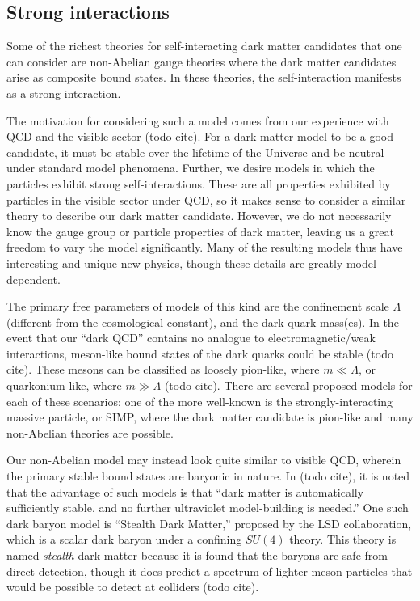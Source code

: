 \hypertarget{strong-interactions}{%
\subsection{Strong interactions}\label{strong-interactions}}

Some of the richest theories for self-interacting dark matter candidates
that one can consider are non-Abelian gauge theories where the dark
matter candidates arise as composite bound states. In these theories,
the self-interaction manifests as a strong interaction.

The motivation for considering such a model comes from our experience
with QCD and the visible sector (todo cite). For a dark matter model to
be a good candidate, it must be stable over the lifetime of the Universe
and be neutral under standard model phenomena. Further, we desire models
in which the particles exhibit strong self-interactions. These are all
properties exhibited by particles in the visible sector under QCD, so it
makes sense to consider a similar theory to describe our dark matter
candidate. However, we do not necessarily know the gauge group or
particle properties of dark matter, leaving us a great freedom to vary
the model significantly. Many of the resulting models thus have
interesting and unique new physics, though these details are greatly
model-dependent.

The primary free parameters of models of this kind are the confinement
scale \(\Lambda\) (different from the cosmological constant), and the
dark quark mass(es). In the event that our ``dark QCD'' contains no
analogue to electromagnetic/weak interactions, meson-like bound states
of the dark quarks could be stable (todo cite). These mesons can be
classified as loosely pion-like, where \(m \ll \Lambda\), or
quarkonium-like, where \(m \gg \Lambda\) (todo cite). There are several
proposed models for each of these scenarios; one of the more well-known
is the strongly-interacting massive particle, or SIMP, where the dark
matter candidate is pion-like and many non-Abelian theories are
possible.

Our non-Abelian model may instead look quite similar to visible QCD,
wherein the primary stable bound states are baryonic in nature. In (todo
cite), it is noted that the advantage of such models is that ``dark
matter is automatically sufficiently stable, and no further ultraviolet
model-building is needed.'' One such dark baryon model is ``Stealth Dark
Matter,'' proposed by the LSD collaboration, which is a scalar dark
baryon under a confining \(SU(4)\) theory. This theory is named
\emph{stealth} dark matter because it is found that the baryons are safe
from direct detection, though it does predict a spectrum of lighter
meson particles that would be possible to detect at colliders (todo
cite).

